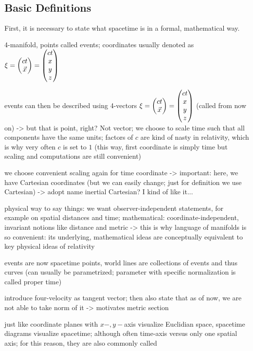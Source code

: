 		\subsection{Basic Definitions}
First, it is necessary to state what spacetime is in a formal, mathematical way.


\begin{defi}

4-manifold, points called events; coordinates usually denoted as $\mathbf{\xi} = \mqty(c t \\ \vec{x}) = \mqty(c t \\ x \\ y \\ z)$

events can then be described using 4-vectors $\mathbf{\xi} = \mqty(c t \\ \vec{x}) = \mqty(c t \\ x \\ y \\ z)$ (called  from now on) -> but that is point, right? Not vector; we choose to scale time such that all components have the same units; factors of $c$ are kind of nasty in relativity, which is why very often $c$ is set to $1$ (this way, first coordinate is simply time but scaling and computations are still convenient)
\end{defi}
we choose convenient scaling again for time coordinate -> important: here, we have Cartesian coordinates (but we can easily change; just for definition we use Cartesian) -> adopt name inertial Cartesian? I kind of like it...



physical way to say things: we want observer-independent statements, for example on spatial distances and time; mathematical: coordinate-independent, invariant notions like distance and metric -> this is why language of manifolds is so convenient: its underlying, mathematical ideas are conceptually equivalent to key physical ideas of relativity



events are now spacetime points, world lines are collections of events and thus curves (can usually be parametrized; parameter with specific normalization is called proper time)


introduce four-velocity as tangent vector; then also state that as of now, we are not able to take norm of it -> motivates metric section



just like coordinate planes with $x-, y-$axis visualize Euclidian space, spacetime diagrams visualize spacetime; although often time-axis versus only one spatial axis; for this reason, they are also commonly called 







